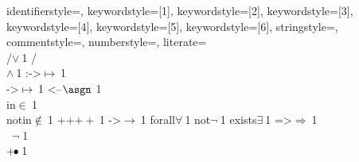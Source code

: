{%
identifierstyle={\color{black}},
keywordstyle=[1]{\color{violet}},
keywordstyle=[2]{\color{forestgreen}},
keywordstyle=[3]{\color{forestgreen}},
keywordstyle=[4]{\color{blue}},
keywordstyle=[5]{\color{red}},
keywordstyle=[6]{\color{violet}},
stringstyle=,
commentstyle=\ttfamily\color{brown},
numberstyle=\tiny,
literate={\\/}{{$\lor~$}}1
         {/\\}{{$\land~$}}1
         {:->}{{$\mapsto~$\!}}1
         {\\->}{{$\mapsto~$\!}}1
         {<--}{{$\asgn~$}}1
         {\\in}{{$\in~$}}1
         {\\notin}{{$\notin~$}}1
         {++}{{$+\!+\!~$}}1
         {->}{{$\to~$}}1         
         {forall}{{$\forall~$}}1
         {not}{{$\lnot~$}}1         
         {exists}{{$\exists~$}}1
         {=>}{{$\Rightarrow~$}}1
         {\\~}{{$\lnot\;$}}1
         {\\+}{{$\!\bullet\!~$}}1
}

\lstset{language=Coq}
